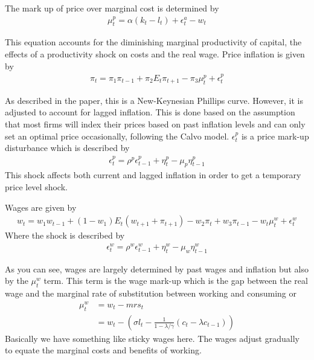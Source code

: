\documentclass{beamer}
\begin{document}
\begin{frame}
The mark up of price over marginal cost is determined by
\begin{align*}
  \mu_t^p = \alpha(k_t-l_t) + \epsilon_t^a - w_t
\end{align*}

This equation accounts for the diminishing marginal productivity of capital, the effects of a productivity shock on costs and the real wage.
Price inflation is given by
\begin{align*}
  \pi_t = \pi_1\pi_{t-1} +\pi_2 E_t\pi_{t+1} - \pi_3\mu_t^p + \epsilon_t^p
\end{align*}
\end{frame}

\begin{frame}
  As described in the paper, this is a New-Keynesian Phillips curve. 
However, it is adjusted to account for lagged inflation. 
This is done based on the assumption that most firms will index their prices based on past inflation levels and can only set an optimal price occasionally, following the Calvo model. 
$\epsilon_t^p$ is a price mark-up disturbance which is described by
\begin{align*}
  \epsilon_t^p = \rho^p \epsilon^p_{t-1} + \eta_t^p - \mu_p\eta_{t-1}^p
\end{align*}
This shock affects both current and lagged inflation in order to get a temporary price level shock. 

\end{frame}

\begin{frame}
  Wages are given by 
\begin{align*}
  w_t = w_1w_{t-1} + (1-w_1)E_t(w_{t+1} + \pi_{t+1}) - w_2\pi_t + w_3\pi_{t-1} - w_t\mu_t^w + \epsilon_t^w
\end{align*}
Where the shock is described by
\begin{align*}
  \epsilon_t^w = \rho^w \epsilon^w_{t-1} + \eta_t^w - \mu_w \eta_{t-1}^w
\end{align*}
\end{frame}

\begin{frame}
As you can see, wages are largely determined by past wages and inflation but also by the $\mu_t^w$ term. 
This term is the wage mark-up which is the gap between the real wage and the marginal rate of substitution between working and consuming or
\begin{align*}
  \mu_t^w &= w_t - mrs_t\\
  &= w_t - \left( \sigma l_t - \frac{1}{1-\lambda/\gamma} (c_t - \lambda c_{t-1}) \right)  
\end{align*}
Basically we have something like sticky wages here. The wages adjust gradually to equate the marginal costs and benefits of working.

\end{frame}
\end{document}
